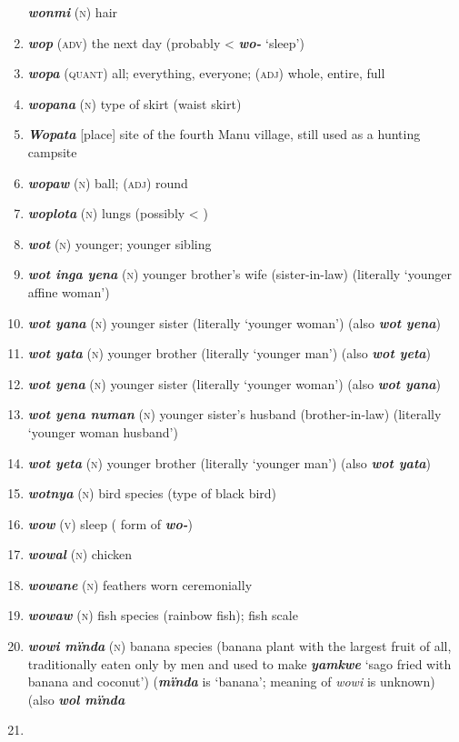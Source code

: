 \begin{enumerate}[noitemsep, label={}, align=left, widest=190, labelsep=1ex,leftmargin=*,itemindent=-10pt]
\textbf{\textit{wonmi}} (\textsc{n}) hair \item 
\textbf{\textit{wop}} (\textsc{adv}) the next day (probably < \textbf{\textit{wo-}} ‘sleep’) \item 
\textbf{\textit{wopa}} (\textsc{quant}) all; everything, everyone; (\textsc{adj}) whole, entire, full \item 
\textbf{\textit{wopana}} (\textsc{n}) type of skirt (waist skirt) \item 
\textbf{\textit{Wopata}} [place] site of the fourth Manu village, still used as a hunting campsite \item 
\textbf{\textit{wopaw}} (\textsc{n}) ball; (\textsc{adj}) round \item 
\textbf{\textit{woplota}} (\textsc{n}) lungs (possibly < ) \item 
\textbf{\textit{wot}} (\textsc{n}) younger; younger sibling \item 
\textbf{\textit{wot inga yena}} (\textsc{n}) younger brother’s wife (sister-in-law) (literally ‘younger affine woman’) \item
\textbf{\textit{wot yana}} (\textsc{n}) younger sister (literally ‘younger woman’) (also \textbf{\textit{wot yena}}) \item
\textbf{\textit{wot yata}} (\textsc{n}) younger brother (literally ‘younger man’) (also \textbf{\textit{wot yeta}}) \item 
\textbf{\textit{wot yena}} (\textsc{n}) younger sister (literally ‘younger woman’) (also \textbf{\textit{wot yana}}) \item 
\textbf{\textit{wot yena numan}} (\textsc{n}) younger sister’s husband (brother-in-law) (literally \linebreak ‘younger woman husband’) \item 
\textbf{\textit{wot yeta}} (\textsc{n}) younger brother (literally ‘younger man’) (also \textbf{\textit{wot yata}}) \item 
\textbf{\textit{wotnya}} (\textsc{n}) bird species (type of black bird) \item 
\textbf{\textit{wow}} (\textsc{v}) sleep ( form of \textbf{\textit{wo-}}) \item 
\textbf{\textit{wowal}} (\textsc{n}) chicken \item 
\textbf{\textit{wowane}} (\textsc{n}) feathers worn ceremonially \item 
\textbf{\textit{wowaw}} (\textsc{n}) fish species (rainbow fish); fish scale \item 
\textbf{\textit{wowi mïnda}} (\textsc{n}) banana species (banana plant with the largest fruit of all, \linebreak traditionally eaten only by men and used to make \textbf{\textit{yamkwe}} ‘sago fried with banana and coconut’) (\textbf{\textit{mïnda}} is ‘banana’; meaning of \textit{wowi} is unknown) (also \textbf{\textit{wol mïnda}} \item 

\end{enumerate}
